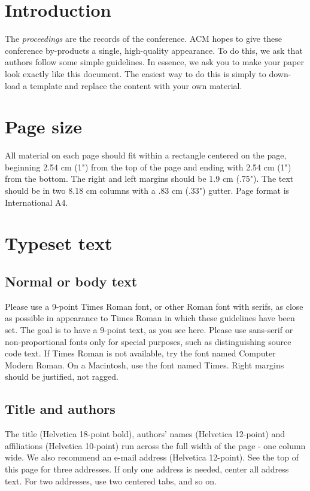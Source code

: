 \documentclass{sig-alternate-br}
\begin{document}


\section{Introduction}
The \textit{proceedings} are the records of the conference. ACM
hopes to give these conference by-products a single, high-quality
appearance. To do this, we ask that authors follow some simple
guidelines. In essence, we ask you to make your paper look exactly
like this document. The easiest way to do this is simply to down-load
a template and replace the content with your own material.

\section{Page size}
All material on each page should fit within a rectangle centered on
the page, beginning 2.54 cm (1") from the top of the page and ending
with 2.54 cm (1") from the bottom.  The right and left margins should be
1.9 cm (.75").  The text should be in two 8.18 cm columns with a .83 cm
(.33") gutter. Page format is International A4.

\section{Typeset text}
\subsection{Normal or body text}
Please use a 9-point Times Roman font, or other Roman font with
serifs, as close as possible in appearance to Times Roman in which
these guidelines have been set. The goal is to have a 9-point text,
as you see here. Please use sans-serif or non-proportional fonts
only for special purposes, such as distinguishing source code text.
If Times Roman is not available, try the font named Computer Modern
Roman. On a Macintosh, use the font named Times. Right margins
should be justified, not ragged.

\subsection{Title and authors}
The title (Helvetica 18-point bold), authors' names (Helvetica
12-point) and affiliations (Helvetica 10-point) run across the full
width of the page - one column wide. We also recommend an  e-mail
address (Helvetica 12-point). See the top of this page for three
addresses. If only one address is needed, center all address text.
For two addresses, use two centered tabs, and so on.
\end{document}

